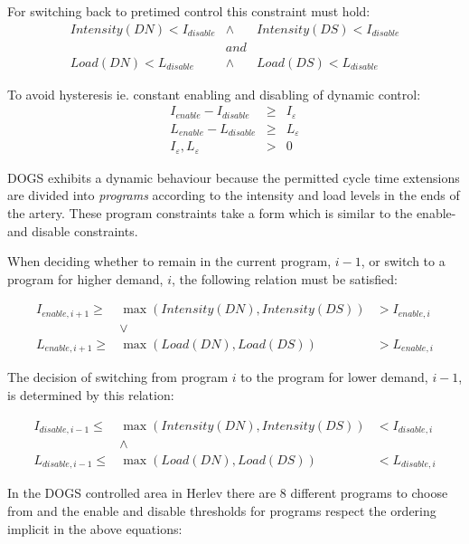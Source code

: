 For switching back to pretimed control this constraint must hold:
\begin{eqnarray*}
Intensity(DN) < I_{disable} & \wedge & Intensity(DS) < I_{disable} \\
& and & \\
Load(DN) < L_{disable} & \wedge & Load(DS) < L_{disable}
\end{eqnarray*}

To avoid hysteresis ie. constant enabling and disabling of dynamic control:
\begin{eqnarray}
I_{enable} - I_{disable} & \geq & I_{\varepsilon} \label{eqn:hysteresis_intensity} \\ 
L_{enable} - L_{disable} & \geq & L_{\varepsilon} \label{eqn:hysteresis_load} \\
I_{\varepsilon},L_{\varepsilon} & > & 0 \label{eqn:hysteresis_limits}
\label{eqn:hysteresis}
\end{eqnarray}

DOGS exhibits a dynamic behaviour because the permitted cycle time extensions are divided into \textit{programs} according to the intensity and load levels in the ends of the artery. These program constraints take a form which is similar to the enable- and disable constraints.

When deciding whether to remain in the current program, $i-1$, or switch to a program for higher demand, $i$, the following relation must be satisfied:

\begin{eqnarray*}
I_{enable,i+1} \geq & \max(Intensity(DN),Intensity(DS)) & > I_{enable,i} \\
& \vee & \\
L_{enable,i+1} \geq & \max(Load(DN),Load(DS))  & > L_{enable,i}
\end{eqnarray*}

The decision of switching from program $i$ to the program for lower demand, $i-1$, is determined by this relation:

\begin{eqnarray*}
I_{disable,i-1} \leq & \max(Intensity(DN),Intensity(DS)) & < I_{disable,i} \\
& \wedge & \\
L_{disable,i-1} \leq & \max(Load(DN),Load(DS))  & < L_{disable,i}
\end{eqnarray*}

In the DOGS controlled area in Herlev there are 8 different programs to choose from and the enable and disable thresholds for programs respect the ordering implicit in the above equations:

